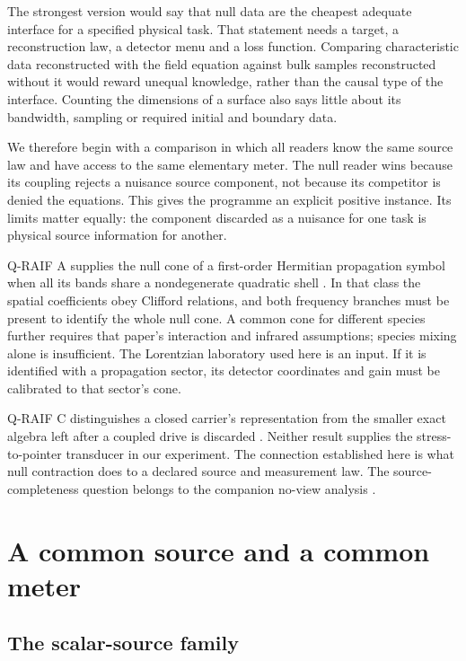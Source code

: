 \documentclass[12pt,a4paper]{article}
\theoremstyle{definition}
\begin{document}
The strongest version would say that null data are the cheapest adequate
interface for a specified physical task. That statement needs a target,
a reconstruction law, a detector menu and a loss function. Comparing
characteristic data reconstructed with the field equation against bulk
samples reconstructed without it would reward unequal knowledge, rather
than the causal type of the interface. Counting the dimensions of a
surface also says little about its bandwidth, sampling or required initial
and boundary data.

We therefore begin with a comparison in which all readers know the same
source law and have access to the same elementary meter. The null reader
wins because its coupling rejects a nuisance source component, not because
its competitor is denied the equations. This gives the programme an
explicit positive instance. Its limits matter equally: the component
discarded as a nuisance for one task is physical source information for
another.

Q-RAIF A supplies the null cone of a first-order Hermitian propagation
symbol when all its bands share a nondegenerate quadratic shell
\cite{Liu2026QRAIFA}. In that class the spatial coefficients obey Clifford
relations, and both frequency branches must be present to identify the
whole null cone. A common cone for different species further requires
that paper's interaction and infrared assumptions; species mixing alone
is insufficient. The Lorentzian laboratory used here is an input. If it
is identified with a propagation sector, its detector coordinates and
gain must be calibrated to that sector's cone.

Q-RAIF C distinguishes a closed carrier's representation from the
smaller exact algebra left after a coupled drive is discarded
\cite{Liu2026QRAIFC}. Neither result supplies the stress-to-pointer
transducer in our experiment. The connection established here is what
null contraction does to a declared source and measurement law. The
source-completeness question belongs to the companion no-view analysis
\cite{Liu2026NoView}.

\section{A common source and a common meter}
\label{sec:interface}

\subsection{The scalar-source family}
\end{document}
